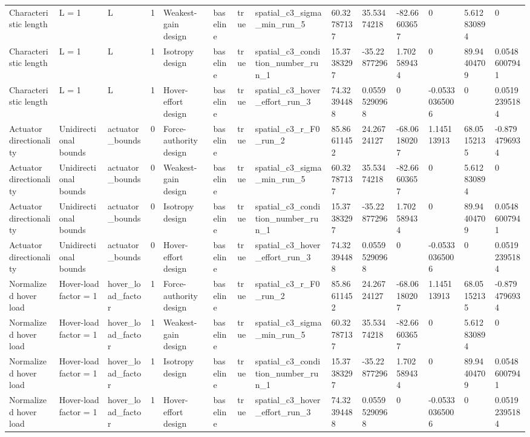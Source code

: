 \begin{tabular}{@{}llllllllllllll@{}}
Characteristic length & L = 1 & L & 1 & Weakest-gain design & baseline & true & spatial\_c3\_sigma\_min\_run\_5 & 60.32787137 & 35.53474218 & -82.66603657 & 0 & 5.612830894 & 0 \\
Characteristic length & L = 1 & L & 1 & Isotropy design & baseline & true & spatial\_c3\_condition\_number\_run\_1 & 15.37383297 & -35.22877296 & 1.702589434 & 0 & 89.94404709 & 0.05486007941 \\
Characteristic length & L = 1 & L & 1 & Hover-effort design & baseline & true & spatial\_c3\_hover\_effort\_run\_3 & 74.32394488 & 0.05595290968 & 0 & -0.05330365006 & 0 & 0.05192395184 \\
Actuator directionality & Unidirectional bounds & actuator\_bounds & 0 & Force-authority design & baseline & true & spatial\_c3\_r\_F0\_run\_2 & 85.86611452 & 24.26724127 & -68.06180207 & 1.145113913 & 68.05152135 & -0.8794796934 \\
Actuator directionality & Unidirectional bounds & actuator\_bounds & 0 & Weakest-gain design & baseline & true & spatial\_c3\_sigma\_min\_run\_5 & 60.32787137 & 35.53474218 & -82.66603657 & 0 & 5.612830894 & 0 \\
Actuator directionality & Unidirectional bounds & actuator\_bounds & 0 & Isotropy design & baseline & true & spatial\_c3\_condition\_number\_run\_1 & 15.37383297 & -35.22877296 & 1.702589434 & 0 & 89.94404709 & 0.05486007941 \\
Actuator directionality & Unidirectional bounds & actuator\_bounds & 0 & Hover-effort design & baseline & true & spatial\_c3\_hover\_effort\_run\_3 & 74.32394488 & 0.05595290968 & 0 & -0.05330365006 & 0 & 0.05192395184 \\
Normalized hover load & Hover-load factor = 1 & hover\_load\_factor & 1 & Force-authority design & baseline & true & spatial\_c3\_r\_F0\_run\_2 & 85.86611452 & 24.26724127 & -68.06180207 & 1.145113913 & 68.05152135 & -0.8794796934 \\
Normalized hover load & Hover-load factor = 1 & hover\_load\_factor & 1 & Weakest-gain design & baseline & true & spatial\_c3\_sigma\_min\_run\_5 & 60.32787137 & 35.53474218 & -82.66603657 & 0 & 5.612830894 & 0 \\
Normalized hover load & Hover-load factor = 1 & hover\_load\_factor & 1 & Isotropy design & baseline & true & spatial\_c3\_condition\_number\_run\_1 & 15.37383297 & -35.22877296 & 1.702589434 & 0 & 89.94404709 & 0.05486007941 \\
Normalized hover load & Hover-load factor = 1 & hover\_load\_factor & 1 & Hover-effort design & baseline & true & spatial\_c3\_hover\_effort\_run\_3 & 74.32394488 & 0.05595290968 & 0 & -0.05330365006 & 0 & 0.05192395184 \\

\end{tabular}
